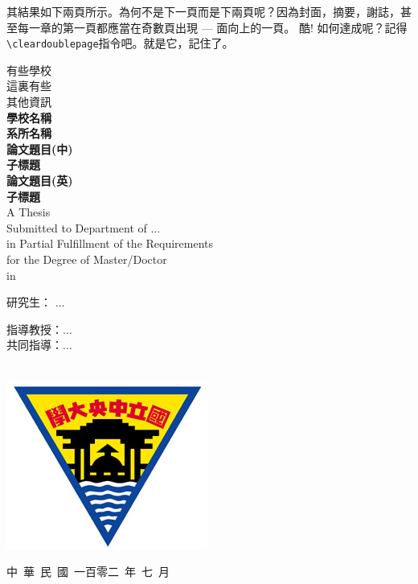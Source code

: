 \begin{appendB}
其結果如下兩頁所示。為何不是下一頁而是下兩頁呢？因為封面，摘要，謝誌，甚至每一章的第一頁都應當在奇數頁出現 --- 面向上的一頁。 酷! 如何達成呢？記得\verb|\cleardoublepage|指令吧。就是它，記住了。

\cleardoublepage{}
{} 
\begin{titlepage}
\thispagestyle{plain}
\setcounter{page}{67}
\begin{center}
有些學校\\
這裏有些\\
其他資訊\\
\vspace{1.5cm}
{\Huge\bfseries 學校名稱 \\[2cm]}
{\Large\bfseries 系所名稱 \\[1cm]}
{\Large\bfseries 論文題目(中) \\子標題\\ [1cm]} 
{\Large\bfseries 論文題目(英) \\子標題 \\ [2cm]}
A Thesis\\
Submitted to Department of $\ldots$\\
in Partial Fulfillment of the Requirements\\
for the Degree of Master/Doctor\\
in \\
\vspace*{1cm}
\begin{minipage}{0.45\textwidth}
\begin{flushleft}
研究生： $\ldots$
\end{flushleft}
\end{minipage}
\begin{minipage}{0.45\textwidth}
\begin{flushright}
指導教授：$\ldots$ \\
共同指導：$\ldots$
\end{flushright}
\end{minipage}\\
\vspace*{1.5cm}
\includegraphics[scale=0.5]{NCUlogo.jpg}
\par
中~華~民~國~一百零二~年~七~月
\end{center}
\end{titlepage}


\end{appendB}
